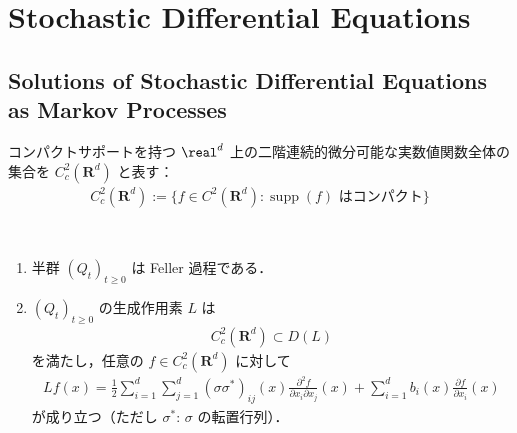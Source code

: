 \documentclass{jsarticle}
\title{}
\author{}
\date{
}
\begin{document}
\setcounter{section}{7}
\section{Stochastic Differential Equations}
\setcounter{subsection}{2}
\subsection{Solutions of Stochastic Differential Equations as Markov Processes}

コンパクトサポートを持つ $\real^d$ 上の二階連続的微分可能な実数値関数全体の集合を $C_c^2(\mathbf{R}^d)$ と表す：
\begin{align}
    C_c^2(\mathbf{R}^d)
    := \{f\in C^2(\mathbf{R}^d):\operatorname{supp}(f)\text{ はコンパクト}\}
\end{align}

\setcounter{thm}{6}
\begin{screen}
    \begin{thm}\label{thm:807}~
        \begin{enumerate}[label=(\arabic*)]
            \item
            半群 $(Q_t)_{t\ge0}$ は Feller 過程である．
            \item
            $(Q_t)_{t\ge0}$ の生成作用素 $L$ は
            \begin{align}
                C_c^2(\mathbf{R}^d)
                \subset D(L)
            \end{align}
            を満たし，任意の $f\in C_c^2(\mathbf{R}^d)$ に対して
            \begin{align}
                Lf(x)
                = \frac{1}{2}\sum_{i=1}^{d}\sum_{j=1}^{d}(\sigma\sigma^{\ast})_{ij}(x)\frac{\partial^{2}f}{\partial x_{i}\partial x_{j}}(x)
                + \sum_{i=1}^{d}b_{i}(x)\frac{\partial f}{\partial x_{i}}(x)
            \end{align}
            が成り立つ（ただし $\sigma^{\ast}$: $\sigma$ の転置行列）．
        \end{enumerate}
    \end{thm}
\end{screen}
\end{document}
